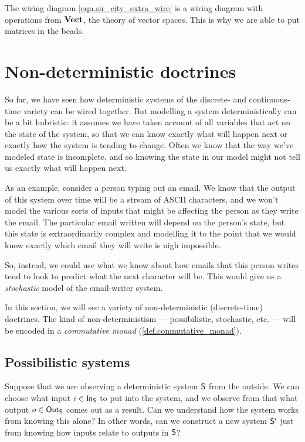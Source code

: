 \documentclass[DynamicalBook]{subfiles}
\begin{document}
\begin{example}
  The wiring diagram \cref{eqn.sir_city_extra_wire} is a wiring diagram with
  operations from $\textbf{Vect}$, the theory of vector spaces. This is why we are
  able to put matrices in the beads.
\end{example}


\section{Non-deterministic doctrines}\label{sec.non_deterministic_systems}

So far, we have seen how deterministic systems of the discrete- and
continuous-time variety can be wired together. But modelling a system
deterministically can be a bit hubristic: it assumes we have taken account of
all variables that act on the state of the system, so that we can know exactly
what will happen next or exactly how the system is tending to change. Often we
know that the way we've modeled state is incomplete, and so knowing the state in
our model might not tell us exactly what will happen next.

As an example, consider a person typing out an email. We know that the output of
this system over time will be a stream of ASCII characters, and we won't model the various sorts
of inputs that might be affecting the person as they write the email. The
particular email written will depend on the person's state, but this state is
extraordinarily complex and modelling it to the point that we would know exactly
which email they will write is nigh impossible. 

So, instead, we could use what
we know about how emails that this person writes tend to look to predict what
the next character will be. This would give us a \emph{stochastic} model of the
email-writer system.

In this section, we will see a variety of non-deterministic (discrete-time)
doctrines. The kind of non-deterministism --- possibilistic, stochastic, etc.
--- will be encoded in a \emph{commutative monad}
(\cref{def.commutative_monad}). 

\subsection{Possibilistic  systems}

Suppose that we are observing a deterministic system $\mathsf{S}$ from the outside.
We can choose what input $i \in \mathsf{In}_{\mathsf{S}}$ to put into the system, and we observe
from that what output $o \in \mathsf{Out}_{\mathsf{S}}$ comes out as a result. Can we understand
how the system works from knowing this alone? In other words, can we construct a
new system $\mathsf{S'}$ just from knowing how inputs relate to outputs in $\mathsf{S}$?
\end{document}
